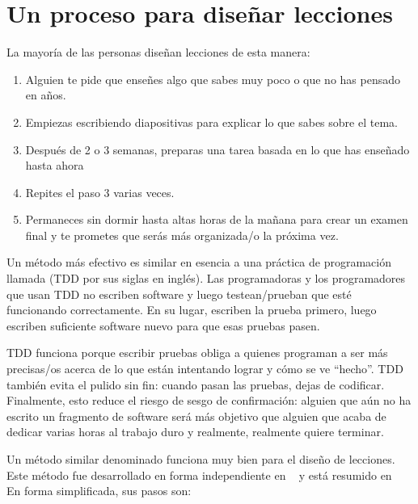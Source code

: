 \chapter{Un proceso para diseñar lecciones}\label{s:process}

La mayoría de las personas diseñan lecciones de esta manera:
\begin{enumerate}

 \item
Alguien te pide que enseñes algo que sabes muy poco o que no has pensado en años.

 \item
Empiezas escribiendo diapositivas para explicar lo que sabes sobre el tema.

 \item
Después de 2 o 3 semanas,
preparas una tarea basada en lo que has enseñado hasta ahora
 \item
Repites el paso 3 varias veces.
 \item
Permaneces sin dormir hasta altas horas de la mañana
para crear un examen final
y te prometes que serás más organizada/o la próxima vez.
\end{enumerate}

Un método más efectivo es similar en esencia a una práctica de programación llamada (TDD por sus siglas en inglés).
Las programadoras y los programadores que usan TDD no escriben software
y luego testean/prueban que esté funcionando correctamente.
En su lugar,
escriben la prueba primero,
luego escriben suficiente software nuevo para que esas pruebas pasen.
 
TDD funciona porque escribir pruebas obliga a quienes programan a ser más precisas/os acerca de lo que están intentando lograr y cómo se ve ``hecho''.
TDD también evita el pulido sin fin:
cuando pasan las pruebas, dejas de codificar.
Finalmente,
esto reduce el riesgo de sesgo de confirmación:
alguien que aún no ha escrito un fragmento de software
será más objetivo que alguien que acaba de dedicar varias horas al trabajo duro
y realmente, realmente quiere terminar.
 
Un método similar denominado  funciona muy bien para el diseño de lecciones.
Este método fue desarrollado en forma independiente en ~\cite{Wigg2005,Bigg2011,Fink2013} y está resumido en~\cite{McTi2013}
En forma simplificada, sus pasos son:
 
